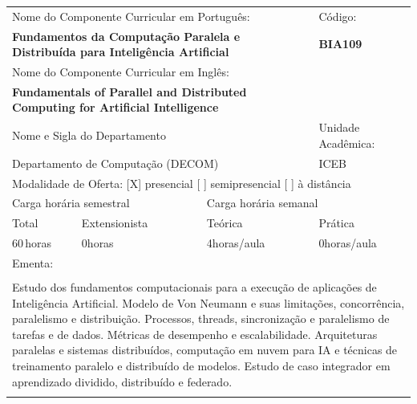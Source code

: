 \documentclass[11pt]{article}
\begin{document}
\begin{center}
\begin{longtable}{|p{4cm}|p{4cm}|p{4cm}|p{4cm}|}
\hline
\multicolumn{3}{|p{12cm}|}{Nome do Componente Curricular em Português:} &
\multicolumn{1}{p{4cm}|}{Código:} \\ 
\multicolumn{3}{|p{12cm}|}{\textbf{Fundamentos da Computação Paralela e Distribuída para Inteligência Artificial}} &
\textbf{BIA109}\\ 
\multicolumn{3}{|p{12cm}|}{Nome do Componente Curricular em Inglês:} & \\ 
\multicolumn{3}{|p{12cm}|}{\textbf{Fundamentals of Parallel and Distributed Computing for Artificial Intelligence}} & \\ 
\hline
\multicolumn{3}{|p{12cm}|}{Nome e Sigla do Departamento} & Unidade Acadêmica: \\ 
\multicolumn{3}{|p{12cm}|}{Departamento de Computação (DECOM)} & {ICEB} \\ 
\hline
\multicolumn{4}{|p{16cm}|}{Modalidade de Oferta:
[X] presencial \hspace{0.6cm}
[ ] semipresencial \hspace{0.6cm}
[ ] à distância}\\
\hline
\multicolumn{2}{|p{8cm}|}{Carga horária semestral} &
\multicolumn{2}{p{8cm}|}{Carga horária semanal}\\
\hline
\multicolumn{1}{|p{4cm}|}{Total} &
\multicolumn{1}{p{4cm}|}{Extensionista} &
\multicolumn{1}{p{4cm}|}{Teórica} &
\multicolumn{1}{p{4cm}|}{Prática} \\ 
\multicolumn{1}{|p{4cm}|}{60\,horas} &
\multicolumn{1}{p{4cm}|}{0\;horas} &
\multicolumn{1}{p{4cm}|}{4\;horas/aula} &
\multicolumn{1}{p{4cm}|}{0\;horas/aula} \\ 
\hline
\multicolumn{4}{|p{16cm}|}{Ementa:}\\
\multicolumn{4}{|p{16cm}|}{}\\
\multicolumn{4}{|p{\dimexpr 16cm + 6\tabcolsep\relax}|}{Estudo dos fundamentos computacionais para a execução de aplicações de Inteligência Artificial. Modelo de Von Neumann e suas limitações, concorrência, paralelismo e distribuição. Processos, threads, sincronização e paralelismo de tarefas e de dados. Métricas de desempenho e escalabilidade. Arquiteturas paralelas e sistemas distribuídos, computação em nuvem para IA e técnicas de treinamento paralelo e distribuído de modelos. Estudo de caso integrador em aprendizado dividido, distribuído e federado.}\\
\multicolumn{4}{|p{16cm}|}{}\\

\end{longtable}
\end{center}
\end{document}
